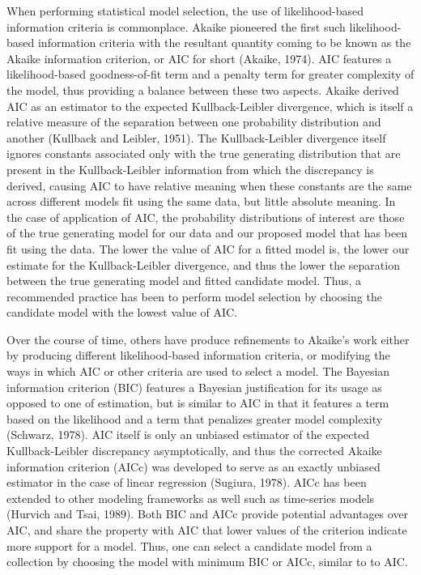 		When performing statistical model selection, the use of likelihood-based information criteria is commonplace. Akaike pioneered the first such likelihood-based information criteria
		with the resultant quantity coming to be known as the Akaike information criterion, or AIC for short (Akaike, 1974). AIC features a likelihood-based goodness-of-fit term and a
		penalty term for greater complexity of the model, thus providing a balance between these two aspects. Akaike derived AIC as an estimator to the expected Kullback-Leibler divergence,
		which is itself a relative measure of the separation between one probability distribution and another (Kullback and Leibler, 1951). The Kullback-Leibler divergence itself ignores constants
		associated only with the true generating distribution that are present in the Kullback-Leibler information from which the discrepancy is derived, causing AIC to have relative meaning when these constants
		are the same across different models fit using the same data, but little absolute meaning. In the case of application of AIC, the probability distributions of interest are those of the true generating model
		for our data and our proposed model that has been fit using the data. The lower the value of AIC for a fitted model is, the lower our estimate for the Kullback-Leibler divergence,
		and thus the lower the separation between the true generating model and fitted candidate model. Thus, a recommended practice has been to perform model selection by choosing
		the candidate model with the lowest value of AIC.

		Over the course of time, others have produce refinements to Akaike's work either by producing different likelihood-based information criteria, or modifying the ways in which AIC or other
		criteria are used to select a model. The Bayesian information criterion (BIC) features a Bayesian justification for its usage as opposed to one of estimation, but is similar to AIC in that
		it features a term based on the likelihood and a term that penalizes greater model complexity (Schwarz, 1978). AIC itself is only an unbiased estimator of the expected Kullback-Leibler discrepancy
		asymptotically, and thus the corrected Akaike information criterion (AICc) was developed to serve as an exactly unbiased estimator in the case of linear regression (Sugiura, 1978). AICc has
		been extended to other modeling frameworks as well such as time-series models (Hurvich and Tsai, 1989). Both BIC and AICc provide potential advantages over AIC, and share the property with
		AIC that lower values of the criterion indicate more support for a model. Thus, one can select a candidate model from a collection by choosing the model with minimum BIC or AICc, similar to
		to AIC.

